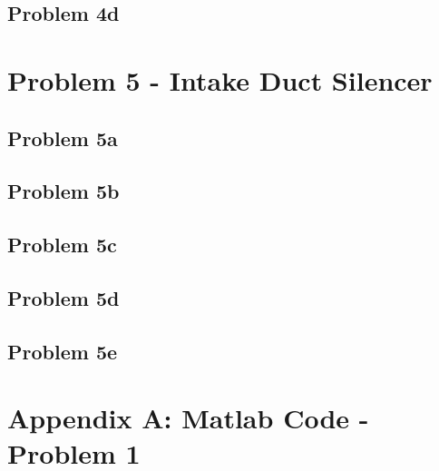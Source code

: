 \subsection*{Problem 4d}










\newpage
\section*{Problem 5 - Intake Duct Silencer}

\subsection*{Problem 5a}

\subsection*{Problem 5b}

\subsection*{Problem 5c}

\subsection*{Problem 5d}

\subsection*{Problem 5e}






\newpage
\section*{Appendix A:  Matlab Code - Problem 1}

